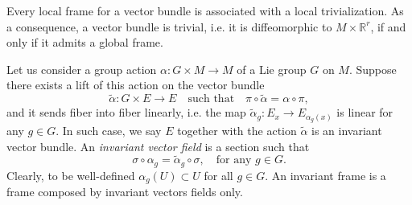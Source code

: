 \documentclass{article}
\numberwithin{equation}{section}
\theoremstyle{definition}
\newcommand{\R}{\mathbb{R}}
\begin{document}
Every local frame for a vector bundle is associated with a local trivialization. As a consequence, a vector bundle is trivial, i.e. it is diffeomorphic to $M\times \R^r$, if and only if it admits a global frame.

\medskip

Let us consider a group action $\alpha:G\times M\to M$ of a Lie group $G$ on $M$. Suppose there exists a lift of this action on the vector bundle
\begin{equation}
    \tilde\alpha:G\times E\to E \quad \text{such that} \quad \pi\circ\tilde\alpha=\alpha\circ\pi,
\end{equation}
and it sends fiber into fiber linearly, i.e. the map $\tilde\alpha_g:E_x\to E_{\alpha_g(x)}$ is linear for any $g\in G$. In such case, we say $E$ together with the action $\tilde\alpha$ is an invariant vector bundle. An \textit{invariant vector field} is a section such that
\begin{equation}
    \sigma\circ \alpha_g=\tilde\alpha_g\circ \sigma, \quad \text{for any }g\in G.
\end{equation}
Clearly, to be well-defined $\alpha_g(U)\subset U$ for all $g\in G$. An invariant frame is a frame composed by invariant vectors fields only.
\end{document}
